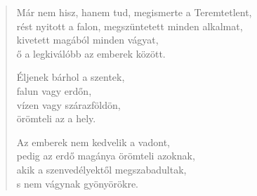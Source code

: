 \begin{verse}
 Már nem hisz, hanem tud, megismerte a Teremtetlent,\\
rést nyitott a falon, megszüntetett minden alkalmat,\\
kivetett magából minden vágyat,\\
ő a legkiválóbb az emberek között.

\newpage

 Éljenek bárhol a szentek,\\
falun vagy erdőn,\\
vízen vagy szárazföldön,\\
örömteli az a hely.

 Az emberek nem kedvelik a vadont,\\
pedig az erdő magánya örömteli azoknak,\\
akik a szenvedélyektől megszabadultak,\\
s nem vágynak gyönyörökre.

\end{verse}


